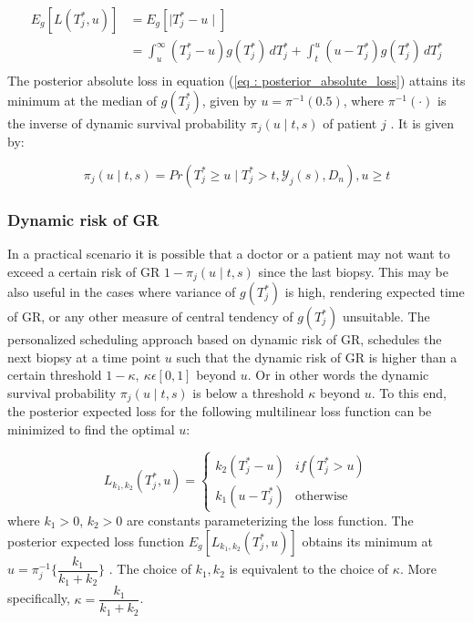 \begin{equation}
\label{eq : posterior_absolute_loss}
\begin{split}
E_g[L(T^*_j, u)] &= E_g[\mid T^*_j - u \mid]\\
&= \int_u^\infty (T^*_j - u) g(T^*_j)\, dT^*_j + \int_t^u (u - T^*_j) g(T^*_j)\, dT^*_j\\
\end{split}
\end{equation}
The posterior absolute loss in equation (\ref{eq : posterior_absolute_loss}) attains its minimum at the median of $g(T^*_j)$, given by $u = \pi^{-1}(0.5)$, where $\pi^{-1}(\cdot)$ is the inverse of dynamic survival probability $\pi_j(u \mid t, s)$ of patient $j$ \citep{rizopoulos2011dynamic}. It is given by:

\begin{equation}
\pi_j(u \mid t, s) = Pr(T^*_j \geq u \mid  T^*_j >t, \mathcal{Y}_j(s), D_n), u \geq t
\end{equation}

\subsubsection{Dynamic risk of GR}
\label{subsubsec : dynamic_risk_definitions}
In a practical scenario it is possible that a doctor or a patient may not want to exceed a certain risk of GR $1 - \pi_j(u \mid t, s)$ since the last biopsy. This may be also useful in the cases where variance of $g(T^*_j)$ is high, rendering expected time of GR, or any other measure of central tendency of $g(T^*_j)$ unsuitable. The personalized scheduling approach based on dynamic risk of GR, schedules the next biopsy at a time point $u$ such that the dynamic risk of GR is higher than a certain threshold $1-\kappa,\ \kappa \epsilon [0,1]$ beyond $u$. Or in other words the dynamic survival probability $\pi_j(u \mid t, s)$ is below a threshold $\kappa$ beyond $u$. To this end, the posterior expected loss for the following multilinear loss function can be minimized to find the optimal $u$:

\begin{equation}
\label{eq : loss_dynamic_risk}
L_{k_1, k_2}(T^*_j, u) =
    \begin{cases}
      k_2(T^*_j-u) & if(T^*_j > u)\\
      k_1(u-T^*_j) & \text{otherwise}
    \end{cases}       
\end{equation}
where $k_1 > 0$, $k_2 > 0$ are constants parameterizing the loss function. The posterior expected loss function $E_g[L_{k_1, k_2}(T^*_j, u)]$ obtains its minimum at $u = \pi_j^{-1}\Big\{\dfrac{k_1}{k_1 + k_2}\Big\}$ \citep{robertBayesianChoice}. The choice of $k_1, k_2$ is equivalent to the choice of $\kappa$. More specifically, $\kappa = \dfrac{k_1}{k_1 + k_2}$.

